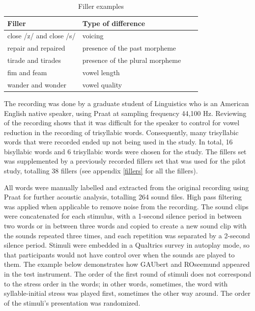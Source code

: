 \documentclass[a4paper]{article}
\begin{document}
\begin{table}[H]
  \begin{center}
    \caption{Filler examples}
    \label{tab:table7}
      \begin{tabular}{|p{5cm}|p{4cm}|p{4cm}|p{4cm}}
      \hline
        Filler & Type of difference \\
      \hline
     close /z/ and close /s/ & voicing \\
      \hline
      repair and repaired & presence of the past morpheme  \\
            \hline
      tirade and tirades & presence of the plural morpheme \\
                  \hline
      fim and feam & vowel length \\
                        \hline
      wander and wonder & vowel quality \\
      \hline
    \end{tabular}
  \end{center}
\end{table}

The recording was done by a graduate student of Linguistics who is an American English native speaker, using Praat at sampling frequency 44,100 Hz. Reviewing of the recording shows that it was difficult for the speaker to control for vowel reduction in the recording of trisyllabic words. Consequently, many trisyllabic words that were recorded ended up not being used in the study. In total, 16 bisyllabic words and 6 trisyllabic words were chosen for the study. The fillers set was supplemented by a previously recorded fillers set that was used for the pilot study, totalling 38 fillers (see appendix \ref{fillers} for all the fillers). 

All words were manually labelled and extracted from the original recording using Praat for further acoustic analysis, totalling 264 sound files. High pass filtering was applied when applicable to remove noise from the recording. The sound clips were concatenated for each stimulus, with a 1-second silence period in between two words or in between three words and copied to create a new sound clip with the sounds repeated three times, and each repetition was separated by a 2-second silence period. Stimuli were embedded in a Qualtrics survey in autoplay mode, so that participants would not have control over when the sounds are played to them. The example below demonstrates how GAUbert and ROseemund appeared in the test instrument. The order of the first round of stimuli does not correspond to the stress order in the words; in other words, sometimes, the word with syllable-initial stress was played first, sometimes the other way around. The order of the stimuli's presentation was randomized.
\end{document}
